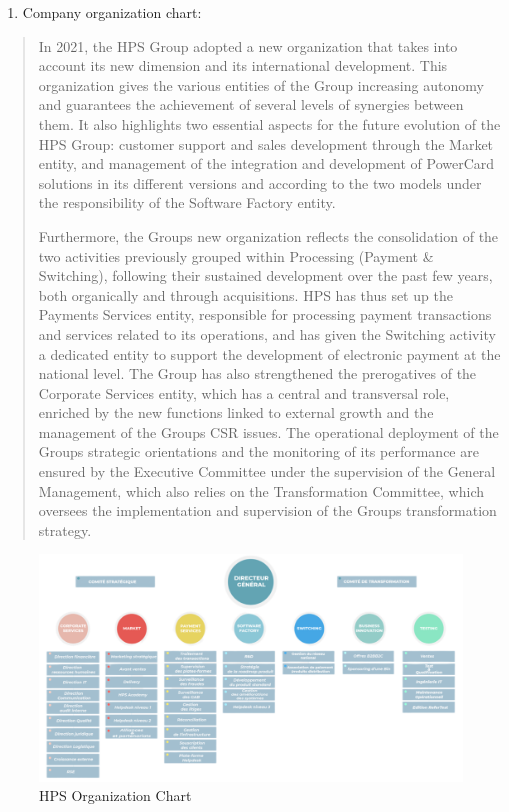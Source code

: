 \documentclass[12pt,a4paper]{report}
\begin{document}
\begin{enumerate}
\def\labelenumi{\arabic{enumi}.}
\setcounter{enumi}{6}
\item
  \protect\hypertarget{_Toc201954401}{}{}Company organization chart:
\end{enumerate}

\begin{quote}
In 2021, the HPS Group adopted a new organization that takes into
account its new dimension and its international development. This
organization gives the various entities of the Group increasing autonomy
and guarantees the achievement of several levels of synergies between
them. It also highlights two essential aspects for the future evolution
of the HPS Group: customer support and sales development through the
Market entity, and management of the integration and development of
PowerCard solutions in its different versions and according to the two
models under the responsibility of the Software Factory entity.

Furthermore, the Group\textquotesingle s new organization reflects the
consolidation of the two activities previously grouped within Processing
(Payment \& Switching), following their sustained development over the
past few years, both organically and through acquisitions. HPS has thus
set up the Payments Services entity, responsible for processing payment
transactions and services related to its operations, and has given the
Switching activity a dedicated entity to support the development of
electronic payment at the national level. The Group has also
strengthened the prerogatives of the Corporate Services entity, which
has a central and transversal role, enriched by the new functions linked
to external growth and the management of the Group\textquotesingle s CSR
issues. The operational deployment of the Group\textquotesingle s
strategic orientations and the monitoring of its performance are ensured
by the Executive Committee under the supervision of the General
Management, which also relies on the Transformation Committee, which
oversees the implementation and supervision of the
Group\textquotesingle s transformation strategy.
\end{quote}

\begin{figure}[H]
\centering
\includegraphics[width=6.4in]{vertopal_d1b0b2209edd4c6aa8254f57daa0953b/media/image24.png}
\caption{HPS Organization Chart}
\label{fig:hpsOrgChart}
\end{figure}
\end{document}
